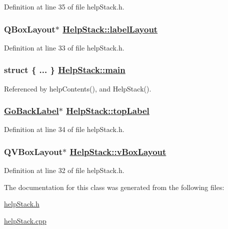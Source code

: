 Definition at line 35 of file help\-Stack.h.\hypertarget{classHelpStack_r1}{
\subsubsection[labelLayout]{\setlength{\rightskip}{0pt plus 5cm}QBox\-Layout$\ast$ \hyperlink{classHelpStack_r1}{Help\-Stack::label\-Layout}}}
\label{classHelpStack_r1}


Definition at line 33 of file help\-Stack.h.\hypertarget{classHelpStack_r6}{
\subsubsection[main]{\setlength{\rightskip}{0pt plus 5cm}struct \{ ... \}   \hyperlink{classHelpStack_r6}{Help\-Stack::main}}}
\label{classHelpStack_r6}




Referenced by help\-Contents(), and Help\-Stack().\hypertarget{classHelpStack_r2}{
\subsubsection[topLabel]{\setlength{\rightskip}{0pt plus 5cm}\hyperlink{classGoBackLabel}{Go\-Back\-Label}$\ast$ \hyperlink{classHelpStack_r2}{Help\-Stack::top\-Label}}}
\label{classHelpStack_r2}


Definition at line 34 of file help\-Stack.h.\hypertarget{classHelpStack_r0}{
\subsubsection[vBoxLayout]{\setlength{\rightskip}{0pt plus 5cm}QVBox\-Layout$\ast$ \hyperlink{classHelpStack_r0}{Help\-Stack::v\-Box\-Layout}}}
\label{classHelpStack_r0}


Definition at line 32 of file help\-Stack.h.

The documentation for this class was generated from the following files:\begin{CompactItemize}
\item 
\hyperlink{helpStack_8h}{help\-Stack.h}\item 
\hyperlink{helpStack_8cpp}{help\-Stack.cpp}\end{CompactItemize}
